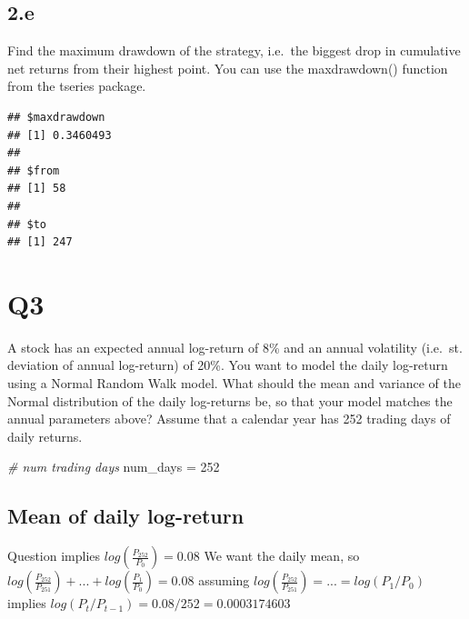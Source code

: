 \documentclass[
  oneside]{book}
\newenvironment{Shaded}{\begin{snugshade}}{\end{snugshade}}
\newcommand{\AttributeTok}[1]{\textcolor[rgb]{0.77,0.63,0.00}{#1}}
\newcommand{\CommentTok}[1]{\textcolor[rgb]{0.56,0.35,0.01}{\textit{#1}}}
\newcommand{\DecValTok}[1]{\textcolor[rgb]{0.00,0.00,0.81}{#1}}
\newcommand{\FunctionTok}[1]{\textcolor[rgb]{0.00,0.00,0.00}{#1}}
\newcommand{\NormalTok}[1]{#1}
\newcommand{\OtherTok}[1]{\textcolor[rgb]{0.56,0.35,0.01}{#1}}
\newcommand{\SpecialCharTok}[1]{\textcolor[rgb]{0.00,0.00,0.00}{#1}}
\newcommand{\StringTok}[1]{\textcolor[rgb]{0.31,0.60,0.02}{#1}}
\begin{document}
\hypertarget{e}{%
\subsection{2.e}\label{e}}

Find the maximum drawdown of the strategy, i.e.~the biggest drop in cumulative net returns from their highest point. You can use the maxdrawdown() function from the tseries package.

\begin{Shaded}
\end{Shaded}

\begin{verbatim}
## $maxdrawdown
## [1] 0.3460493
## 
## $from
## [1] 58
## 
## $to
## [1] 247
\end{verbatim}

\hypertarget{q3}{%
\section{Q3}\label{q3}}

A stock has an expected annual log-return of 8\% and an annual volatility (i.e.~st. deviation of annual log-return) of 20\%. You want to model the daily log-return using a Normal Random Walk model. What should the mean and variance of the Normal distribution of the daily log-returns be, so that your model matches the annual parameters above? Assume that a calendar year has 252 trading days of daily returns.

\begin{Shaded}
\begin{Highlighting}[]
\CommentTok{\# num trading days}
\NormalTok{num\_days }\OtherTok{=} \DecValTok{252}
\end{Highlighting}
\end{Shaded}

\hypertarget{mean-of-daily-log-return}{%
\subsection{Mean of daily log-return}\label{mean-of-daily-log-return}}

Question implies \(log(\frac{P_{252}}{P_0}) = 0.08\)
We want the daily mean, so \(log(\frac{P_{252}}{P_{251}}) + ... + log(\frac{P_1}{P_0}) = 0.08\)
assuming \(log(\frac{P_{252}}{P_{251}}) = ... = log(P_1/P_0)\)
implies \(log(P_t/P_{t-1}) = 0.08/252 = 0.0003174603\)
\end{document}
